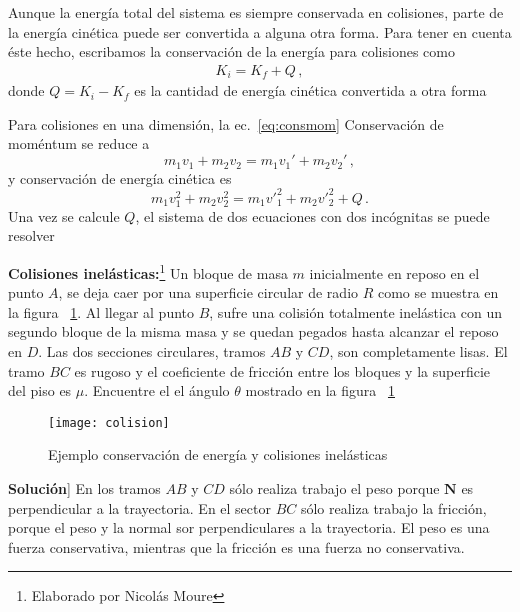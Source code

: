 Aunque la energía total del sistema es siempre conservada en colisiones, parte de la energía cinética puede ser convertida a alguna otra forma. Para tener en cuenta éste hecho, escribamos la conservación de la energía para colisiones como
\begin{align}
\label{eq:calor}
  K_i=K_f+Q\,,
\end{align}
donde $Q=K_i-K_f$ es la cantidad de energía cinética convertida a otra forma

Para colisiones en una dimensión, la ec.~\eqref{eq:consmom}
Conservación de moméntum  se reduce a
\begin{equation}\label{eq:E1}
  m_1 v_1 + m_2 v_2 = m_1 v_1' + m_2 v_2'\,,
\end{equation}
y conservación de energía cinética es
\begin{equation}\label{eq:E2}
  m_1 v^2_1 + m_2 v^2_2 = m_1 {v'}^2_1 + m_2 {v'}^2_2+Q\,.
\end{equation}
Una vez se calcule $Q$, el sistema de dos ecuaciones con dos
incógnitas se puede resolver

\ejemplo{}
\begin{frame}
 \textbf{Colisiones
    inelásticas:}\footnote{Elaborado por Nicolás Moure} Un bloque de masa $m$ inicialmente en reposo
  en el punto $A$, se deja caer por una superficie circular de radio
  $R$ como se muestra en la figura ~\ref{fig:colision}. Al llegar al
  punto $B$, sufre una colisión totalmente inelástica con un segundo
  bloque de la misma masa y se quedan pegados hasta alcanzar el reposo
  en $D$. Las dos secciones circulares, tramos $AB$ y $CD$, son
  completamente lisas. El tramo $BC$ es rugoso y el coeficiente de
  fricción entre los bloques y la superficie del piso es
  $\mu$. Encuentre el  el ángulo $\theta$ mostrado en la figura ~\ref{fig:colision}

  \begin{figure}
    \centering
    \texttt{[image: colision]}
    \caption{Ejemplo conservación de energía y colisiones inelásticas}
    \label{fig:colision}
  \end{figure}


\end{frame}

\noindent
\textbf{Solución}] 
En los tramos $AB$ y $CD$ sólo realiza trabajo el peso porque
$\mathbf{N}$ es perpendicular a la trayectoria. En el sector $BC$ sólo
realiza trabajo la fricción, porque el peso y la normal sor
perpendiculares a la trayectoria. El peso es una fuerza conservativa,
mientras que la fricción es una fuerza no conservativa.



